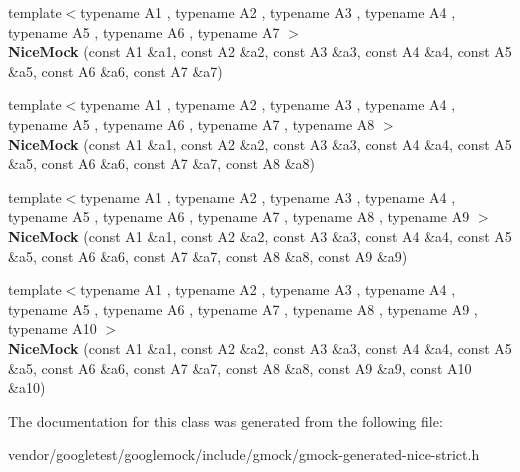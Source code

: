 \begin{DoxyCompactItemize}
\item 
\mbox{\label{classtesting_1_1_nice_mock_a946d75ece1fa3a066b7d9d6ab7828c55}} 
{\footnotesize template$<$typename A1 , typename A2 , typename A3 , typename A4 , typename A5 , typename A6 , typename A7 $>$ }\\{\bfseries Nice\+Mock} (const A1 \&a1, const A2 \&a2, const A3 \&a3, const A4 \&a4, const A5 \&a5, const A6 \&a6, const A7 \&a7)
\item 
\mbox{\label{classtesting_1_1_nice_mock_ae8792aab6c024a50886856bf1093eedc}} 
{\footnotesize template$<$typename A1 , typename A2 , typename A3 , typename A4 , typename A5 , typename A6 , typename A7 , typename A8 $>$ }\\{\bfseries Nice\+Mock} (const A1 \&a1, const A2 \&a2, const A3 \&a3, const A4 \&a4, const A5 \&a5, const A6 \&a6, const A7 \&a7, const A8 \&a8)
\item 
\mbox{\label{classtesting_1_1_nice_mock_a61cfc9282222928590bcdaf851a806c6}} 
{\footnotesize template$<$typename A1 , typename A2 , typename A3 , typename A4 , typename A5 , typename A6 , typename A7 , typename A8 , typename A9 $>$ }\\{\bfseries Nice\+Mock} (const A1 \&a1, const A2 \&a2, const A3 \&a3, const A4 \&a4, const A5 \&a5, const A6 \&a6, const A7 \&a7, const A8 \&a8, const A9 \&a9)
\item 
\mbox{\label{classtesting_1_1_nice_mock_a4baf1da52f4c892fc02f6ba10c0b8c02}} 
{\footnotesize template$<$typename A1 , typename A2 , typename A3 , typename A4 , typename A5 , typename A6 , typename A7 , typename A8 , typename A9 , typename A10 $>$ }\\{\bfseries Nice\+Mock} (const A1 \&a1, const A2 \&a2, const A3 \&a3, const A4 \&a4, const A5 \&a5, const A6 \&a6, const A7 \&a7, const A8 \&a8, const A9 \&a9, const A10 \&a10)
\end{DoxyCompactItemize}


The documentation for this class was generated from the following file\+:\begin{DoxyCompactItemize}
\item 
vendor/googletest/googlemock/include/gmock/gmock-\/generated-\/nice-\/strict.\+h\end{DoxyCompactItemize}
